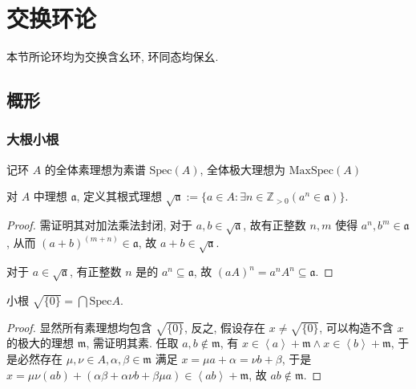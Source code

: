 \section{交换环论}

本节所论环均为交换含幺环, 环同态均保幺.

\subsection{概形}

\subsubsection{大根小根}

\begin{definition}
    记环 \(A\) 的全体素理想为素谱 \(\mathrm{Spec} (A)\), 全体极大理想为 \(\mathrm{MaxSpec} (A)\)
\end{definition}

\begin{definition}
    对 \(A\) 中理想 \(\mathfrak{a}\), 定义其根式理想 \(\sqrt{\mathfrak{a}} := \{a \in A : \exists n \in \mathbb{Z}_{>0} (a^n \in \mathfrak{a})\}\).

    \begin{proof}
        需证明其对加法乘法封闭, 对于 \(a,b \in \sqrt{\mathfrak{a}}\), 故有正整数 \(n,m\) 使得 \(a^n,b^m \in \mathfrak{a}\),
        从而 \((a+b)^(m+n) \in \mathfrak{a}\), 故 \(a + b \in \sqrt{\mathfrak{a}}\).

        对于 \(a \in \sqrt{\mathfrak{a}}\), 有正整数 \(n\) 是的 \(a^n \subseteq \mathfrak{a}\),
        故 \((a A)^n = a^n A^n \subseteq \mathfrak{a}\).
    \end{proof}
\end{definition}

\begin{lemma}
    小根 \(\sqrt{\{0\}} = \bigcap \mathrm{Spec} A\).

    \begin{proof}
        显然所有素理想均包含 \(\sqrt{\{0\}}\), 反之, 假设存在 \(x \neq \sqrt{\{0\}}\),
        可以构造不含 \(x\) 的极大的理想 \(\mathfrak{m}\), 需证明其素. 任取 \(a,b \notin \mathfrak{m}\),
        有 \(x \in \left\langle a \right\rangle + \mathfrak{m} \land x \in \left\langle b \right\rangle + \mathfrak{m}\),
        于是必然存在 \(\mu,\nu \in A,\alpha,\beta \in \mathfrak{m}\) 满足 \(x = \mu a + \alpha = \nu b + \beta\),
        于是 \(x = \mu \nu (a b) + (\alpha \beta + \alpha \nu b + \beta \mu a) \in \left\langle ab\right\rangle + \mathfrak{m}\),
        故 \(ab \notin \mathfrak{m}\).
    \end{proof}
\end{lemma}

